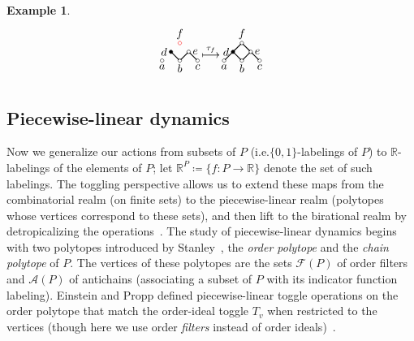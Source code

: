 \documentclass[10pt]{amsart}
\theoremstyle{definition}
\newtheorem{exam}[theo]{Example}
\newcommand{\ie}{i.e.}
\newcommand{\rr}{\mathbb{R}}
\newcommand{\cala}{\mathcal{A}}
\newcommand{\calf}{\mathcal{F}}
\begin{document}
\begin{exam}
\[\begin{tikzpicture}[scale=0.274]
\begin{scope}[shift={(35,-4)}]
\draw[thick] (-0.9, 0.9) -- (-0.1, 0.1);
\draw[thick] (0.9, 0.9) -- (0.1, 0.1);
\draw[thick] (1.1, 0.9) -- (1.9, 0.1);
\draw[red] (0,2) circle [radius=0.2];
\draw[fill] (-1,1) circle [radius=0.2];
\draw (1,1) circle [radius=0.2];
\draw (-2,0) circle [radius=0.2];
\draw (0,0) circle [radius=0.2];
\draw (2,0) circle [radius=0.2];
\node[above] at (0,2) {$f$};
\node[left] at (-1,1) {$d$};
\node[right] at (1,1) {$e$};
\node[below] at (-2,0) {$a$};
\node[below] at (0,0) {$b$};
\node[below] at (2,0) {$c$};
\end{scope}
\node at (38.5,-3) {$\stackrel{\tau_f}{\longmapsto}$};
\begin{scope}[shift={(42,-4)}]
\draw[thick] (-0.1, 1.9) -- (-0.9, 1.1);
\draw[thick] (0.1, 1.9) -- (0.9, 1.1);
\draw[thick] (-1.1, 0.9) -- (-1.9, 0.1);
\draw[thick] (-0.9, 0.9) -- (-0.1, 0.1);
\draw[thick] (0.9, 0.9) -- (0.1, 0.1);
\draw[thick] (1.1, 0.9) -- (1.9, 0.1);
\draw (0,2) circle [radius=0.2];
\draw[fill] (-1,1) circle [radius=0.2];
\draw (1,1) circle [radius=0.2];
\draw (-2,0) circle [radius=0.2];
\draw (0,0) circle [radius=0.2];
\draw (2,0) circle [radius=0.2];
\node[above] at (0,2) {$f$};
\node[left] at (-1,1) {$d$};
\node[right] at (1,1) {$e$};
\node[below] at (-2,0) {$a$};
\node[below] at (0,0) {$b$};
\node[below] at (2,0) {$c$};
\end{scope}
\end{tikzpicture}
\]
\end{exam}

\subsection{Piecewise-linear dynamics}
Now we generalize our actions from subsets of $P$ (\ie $\{0,1 \}$-labelings of $P$)
to $\rr$-labelings of the elements of $P$; let $\rr^P\coloneqq \{f:P\rightarrow \rr \}$ denote the set of such labelings.
The toggling perspective allows us to extend these maps from the combinatorial realm
(on finite sets) to the piecewise-linear realm (polytopes whose vertices correspond to these
sets), and then lift to the birational realm by detropicalizing the operations~\cite{einpropp}.
The study of piecewise-linear dynamics begins with two polytopes introduced by Stanley~\cite{Sta86}, the \textit{order polytope} and the \textit{chain polytope} of $P$.
The vertices of these polytopes are the sets $\calf(P)$ of order filters and $\cala(P)$ of antichains (associating a subset of $P$ with its indicator function
labeling). Einstein and Propp defined piecewise-linear toggle operations on the order
polytope that match the order-ideal toggle $T_v$ when restricted to the vertices (though here
we use order \emph{filters} instead of order ideals)~\cite[\S~3,4]{einpropp}.
\end{document}
